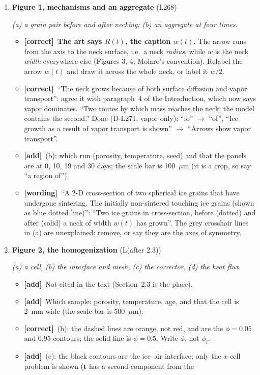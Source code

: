 \documentclass[11pt]{article}
\newcommand{\Pg}[3]{\item \textbf{#1} {\small(#2)}\par\textit{#3}}
\newcommand{\tC}{\textcolor{miss}{\textbf{[correct]}}\ }
\newcommand{\tG}{\textcolor{stale}{\textbf{[wording]}}\ }
\newcommand{\tA}{\textcolor{have}{\textbf{[add]}}\ }
\newcommand{\add}[1]{\textcolor{revA}{#1}}
\begin{document}
\begin{enumerate}
\Pg{Figure 1, mechanisms and an aggregate}{L268}{(a) a grain pair before and after necking; (b) an aggregate at four times.}
  \begin{itemize}
  \item \tC \textbf{The art says $R(t)$, the caption $w(t)$.} The arrow runs
    from the axis to the neck surface, i.e.\ a neck \emph{radius}, while $w$
    is the neck \emph{width} everywhere else (Figures 3, 4; Molaro's
    convention). Relabel the arrow $w(t)$ and draw it across the whole neck,
    or label it $w/2$.
  \item \tC ``The neck grows because of both surface diffusion and vapor
    transport'': agree it with paragraph~4 of the Introduction, which now
    says vapor dominates. ``Two routes by which mass reaches the neck; the
    model contains the second.''
    \add{Done (D-L271, vapor only); ``fo'' $\to$ ``of'', ``Ice growth as a result of vapor transport is shown'' $\to$ ``Arrows show vapor transport''.}
  \item \tA (b): which run (porosity, temperature, seed) and that the panels
    are at 0, 10, 19 and 30 days; the scale bar is 100~$\mu$m (it is a
    crop, so say ``a region of'').
  \item \tG ``A 2-D cross-section of two spherical ice grains that have
    undergone sintering. The initially non-sintered touching ice grains
    (shown as blue dotted line)'': ``Two ice grains in cross-section, before
    (dotted) and after (solid) a neck of width $w(t)$ has grown''. The grey
    crosshair lines in (a) are unexplained: remove, or say they are the axes
    of symmetry.
  \end{itemize}
\Pg{Figure 2, the homogenization}{L(after 2.3)}{(a) a cell, (b) the interface and mesh, (c) the corrector, (d) the heat flux.}
  \begin{itemize}
  \item \tA Not cited in the text (Section~2.3 is the place).
  \item \tA Which sample: porosity, temperature, age, and that the cell is
    2~mm wide (the scale bar is 500~$\mu$m).
  \item \tC (b): the dashed lines are orange, not red, and are the
    $\phi = 0.05$ and $0.95$ contours; the solid line is $\phi = 0.5$.
    Write $\phi$, not $\phi_i$.
  \item \tA (c): the black contours are the ice--air interface; only the
    $x$ cell problem is shown ($\mathbf{t}$ has a second component from the

\end{itemize}
\end{enumerate}
\end{document}
